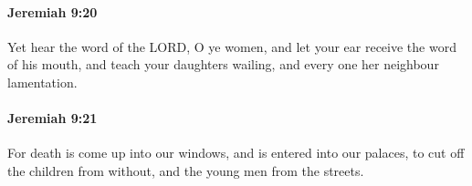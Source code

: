 		\paragraph{Jeremiah 9:20} %
			\label{JEREMIAH-9-20}

			Yet hear the word of the LORD, O ye women, and let your ear receive the word of his mouth, and teach your daughters wailing, and every one her neighbour lamentation.


		\paragraph{Jeremiah 9:21} %
			\label{JEREMIAH-9-21}

			For death is come up into our windows, and is entered into our palaces, to cut off the children from without, and the young men from the streets.


